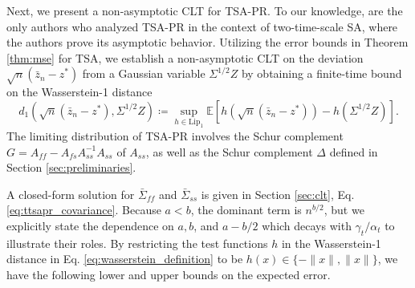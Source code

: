 Next, we present a non-asymptotic CLT for TSA-PR.
To our knowledge, \citet{mokkadem2006convergence} are the only authors who analyzed TSA-PR in the context of two-time-scale SA, where the authors prove its asymptotic behavior.
Utilizing the error bounds in Theorem \ref{thm:mse} for TSA, we establish a non-asymptotic CLT on the deviation $\sqrt{n}(\bar{z}_n - z^*)$ from a Gaussian variable $\Sigma^{1/2} Z$ by obtaining a finite-time bound on the Wasserstein-1 distance
\begin{equation}\label{eq:wasserstein_definition}
        d_1 \left(\sqrt{n}(\bar{z}_n - z^*), \Sigma^{1/2} Z\right) 
        \coloneqq \sup_{h \in \mathrm{Lip}_1} \mathbb{E}\left[h\left(\sqrt{n}(\bar{z}_n - z^*)\right) - h \left(\Sigma^{1/2} Z \right) \right]
        .    
\end{equation}
The limiting distribution of TSA-PR involves the Schur complement $G = A_{ff} - A_{fs} A_{ss}^{-1} A_{ss}$ of $A_{ss}$, as well as the Schur complement $\Delta$ defined in Section \ref{sec:preliminaries}.
\begin{theorem}\label{thm:clt}
    \CLT
\end{theorem}
A closed-form solution for $\bar{\Sigma}_{ff}$ and $\bar{\Sigma}_{ss}$ is given in Section \ref{sec:clt}, Eq. \eqref{eq:ttsapr_covariance}.
Because $a < b$, the dominant term is $n^{b/2}$, but we explicitly state the dependence on $a, b$, and $a-b/2$ which decays with $\gamma_t/\alpha_t$ to illustrate their roles. 
By restricting the test functions $h$ in the Wasserstein-1 distance in Eq. \eqref{eq:wasserstein_definition} to be $h(x) \in \{-\lVert x \rVert, \lVert x \rVert\}$, we have the following lower and upper bounds on the expected error.
